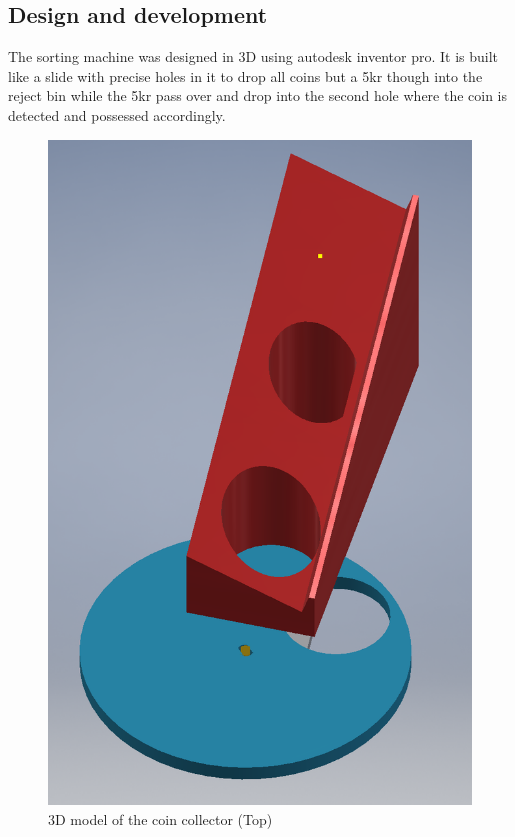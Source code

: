 \documentclass[HardwareDesign/HardwareDesign_main.tex]{subfiles}
\begin{document}
\subsection{Design and development}\label{subsec:designAndDevelopment}
The sorting machine was designed in 3D using autodesk inventor pro.
It is built like a slide with precise holes in it to drop all coins but a 5kr though into the reject bin while the 5kr pass over and drop into the second hole where the coin is detected and possessed accordingly.
\begin{figure}
    \centering
    \includegraphics[width=\textwidth]{HardwareDesign/Bolddispenser/graphics/coinmaster.png}
    \caption{3D model of the coin collector (Top)}
    \label{fig:3D-CoinTop}
\end{figure}
\end{document}
